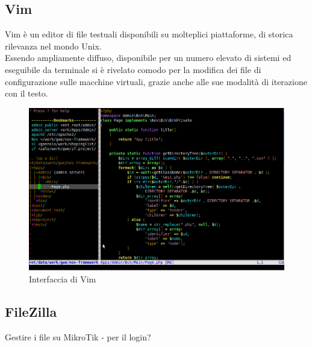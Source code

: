 \documentclass[Tesi.tex]{subfiles}
\begin{document}
\subsection{Vim}
Vim è un editor di file testuali disponibili su molteplici piattaforme, di storica rilevanza nel mondo Unix. \\
Essendo ampliamente diffuso, disponibile per un numero elevato di sistemi ed eseguibile da terminale si è rivelato comodo per la modifica dei file di configurazione sulle macchine virtuali, grazie anche alle sue modalità di iterazione con il testo.
\begin{figure}[H]
	\centering
	\includegraphics[width=0.65\linewidth]{"images/vim"}
	\caption{Interfaccia di Vim}
	\label{fig:Interfaccia di Vim}
\end{figure}


\subsection{FileZilla}
Gestire i file su MikroTik - per il login?
\end{document}
